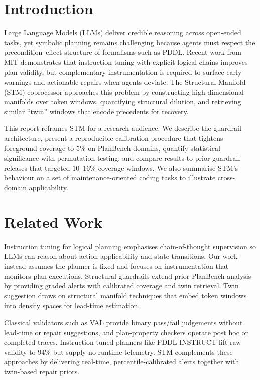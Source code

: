 \documentclass[11pt]{article}
\begin{document}
\section{Introduction}
Large Language Models (LLMs) deliver credible reasoning across open-ended
tasks, yet symbolic planning remains challenging because agents must respect the
precondition--effect structure of formalisms such as PDDL. Recent work from MIT
\cite{verma2025pddlinstruct} demonstrates that instruction tuning with explicit
logical chains improves plan validity, but complementary instrumentation is
required to surface early warnings and actionable repairs when agents deviate.
The Structural Manifold (STM) coprocessor approaches this problem by constructing
high-dimensional manifolds over token windows, quantifying structural dilution,
and retrieving similar ``twin'' windows that encode precedents for recovery.

This report reframes STM for a research audience. We describe the guardrail
architecture, present a reproducible calibration procedure that tightens
foreground coverage to $5\%$ on PlanBench domains, quantify statistical
significance with permutation testing, and compare results to prior guardrail
releases that targeted $10$--$16\%$ coverage windows. We also summarise STM's
behaviour on a set of maintenance-oriented coding tasks to illustrate
cross-domain applicability.

\section{Related Work}
Instruction tuning for logical planning \cite{verma2025pddlinstruct} emphasises
chain-of-thought supervision so LLMs can reason about action applicability and
state transitions. Our work instead assumes the planner is fixed and focuses on
instrumentation that monitors plan executions. Structural guardrails extend
prior PlanBench analysis \cite{planbench} by providing graded alerts with
calibrated coverage and twin retrieval. Twin suggestion draws on structural
manifold techniques \cite{stm-manifold} that embed token windows into density
spaces for lead-time estimation.

Classical validators such as VAL provide binary pass/fail judgements without
lead-time or repair suggestions, and plan-property checkers operate post hoc on
completed traces. Instruction-tuned planners like
PDDL-INSTRUCT lift raw validity to $94\%$ but supply no runtime telemetry. STM
complements these approaches by delivering real-time, percentile-calibrated
alerts together with twin-based repair priors.
\end{document}
